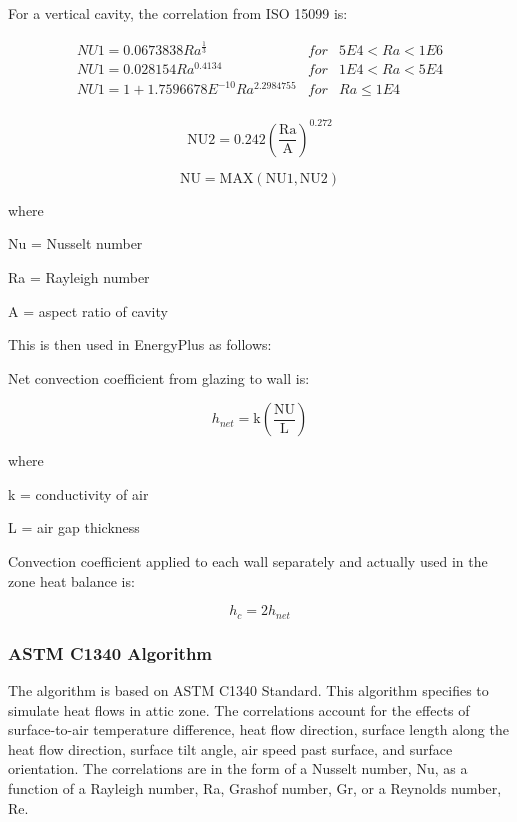 For a vertical cavity, the correlation from ISO 15099 is:

\begin{equation}
\begin{array}{lcl}
    NU1 = 0.0673838 Ra^{\frac{1}{3}} & for &  5E4 < Ra < 1E6 \\
    NU1 = 0.028154 Ra^{0.4134} & for &  1E4 < Ra < 5E4 \\
    NU1 = 1 + 1.7596678E^{-10} Ra^{2.2984755} & for &  Ra \leq 1E4 \\
\end{array}
\end{equation}

\begin{equation}
{\mathrm{NU2}} = 0.242{\left( {{\frac{{{\mathrm{Ra}}}}{{\mathrm{A}}}}} \right)^{0.272}}
\end{equation}

\begin{equation}
{\mathrm{NU = MAX(NU1,NU2)}}
\end{equation}

where

Nu = Nusselt number

Ra = Rayleigh number

A = aspect ratio of cavity

This is then used in EnergyPlus as follows:

Net convection coefficient from glazing to wall is:

\begin{equation}
{h_{net}} = {\mathrm{k}}\left( {{\frac{{{\mathrm{NU}}}}{{\mathrm{L}}}}} \right)
\end{equation}

where

k = conductivity of air

L = air gap thickness

Convection coefficient applied to each wall separately and actually used in the zone heat balance is:

\begin{equation}
{h_c} = 2{h_{net}}
\end{equation}

\subsubsection{ASTM C1340 Algorithm}\label{ASTM-C1340-algorithm}

The algorithm is based on ASTM C1340 Standard. This algorithm specifies to simulate heat flows in attic zone. The correlations account for the effects of surface-to-air temperature difference, heat flow direction, surface length along the heat flow direction, surface tilt angle, air speed past surface, and surface orientation. The correlations are in the form of a Nusselt number, Nu, as a function of a Rayleigh number, Ra, Grashof number, Gr, or a Reynolds number, Re.

